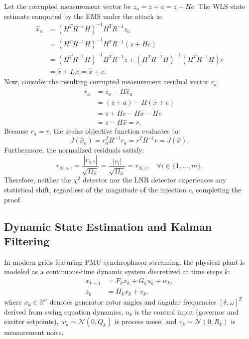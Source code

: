 \documentclass[journal,compsoc]{IEEEtran}
\begin{document}
\begin{IEEEproof}
Let the corrupted measurement vector be $z_a = z + a = z + Hc$. The WLS state estimate computed by the EMS under the attack is:
\begin{align}
    \hat{x}_a &= (H^T R^{-1} H)^{-1} H^T R^{-1} z_a \nonumber \\
    &= (H^T R^{-1} H)^{-1} H^T R^{-1} (z + Hc) \nonumber \\
    &= (H^T R^{-1} H)^{-1} H^T R^{-1} z + (H^T R^{-1} H)^{-1} (H^T R^{-1} H) c \nonumber \\
    &= \hat{x} + I_n c = \hat{x} + c.
\end{align}
Now, consider the resulting corrupted measurement residual vector $r_a$:
\begin{align}
    r_a &= z_a - H \hat{x}_a \nonumber \\
    &= (z + a) - H (\hat{x} + c) \nonumber \\
    &= z + Hc - H\hat{x} - Hc \nonumber \\
    &= z - H\hat{x} = r.
\end{align}
Because $r_a = r$, the scalar objective function evaluates to:
\begin{equation}
    J(\hat{x}_a) = r_a^T R^{-1} r_a = r^T R^{-1} r = J(\hat{x}).
\end{equation}
Furthermore, the normalized residuals satisfy:
\begin{equation}
    r_{N,a,i} = \frac{|r_{a,i}|}{\sqrt{\Omega_{ii}}} = \frac{|r_i|}{\sqrt{\Omega_{ii}}} = r_{N,i}, \quad \forall i \in \{1, \dots, m\}.
\end{equation}
Therefore, neither the $\chi^2$ detector nor the LNR detector experiences any statistical shift, regardless of the magnitude of the injection $c$, completing the proof.
\end{IEEEproof}

\subsection{Dynamic State Estimation and Kalman Filtering}
In modern grids featuring PMU synchrophasor streaming, the physical plant is modeled as a continuous-time dynamic system discretized at time steps $k$:
\begin{align}
    x_{k+1} &= F_k x_k + G_k u_k + w_k, \label{eq:state_dyn} \\
    z_k &= H_k x_k + v_k, \label{eq:meas_dyn}
\end{align}
where $x_k \in \mathbb{R}^n$ denotes generator rotor angles and angular frequencies $[\delta, \omega]^T$ derived from swing equation dynamics, $u_k$ is the control input (governor and exciter setpoints), $w_k \sim \mathcal{N}(0, Q_k)$ is process noise, and $v_k \sim \mathcal{N}(0, R_k)$ is measurement noise.
\end{document}
